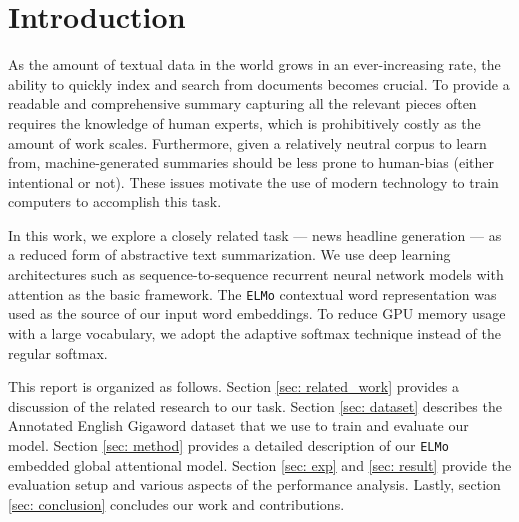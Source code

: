 \section{Introduction}

As the amount of textual data in the world grows in an ever-increasing rate, the ability to quickly index and search from documents becomes crucial. To provide a readable and comprehensive summary capturing all the relevant pieces often requires the knowledge of human experts, which is prohibitively costly as the amount of work scales. Furthermore, given a relatively neutral corpus to learn from, machine-generated summaries should be less prone to human-bias (either intentional or not). These issues motivate the use of modern technology to train computers to accomplish this task. 

In this work, we explore a closely related task --- news headline generation --- as a reduced form of abstractive text summarization. We use deep learning architectures such as sequence-to-sequence recurrent neural network models with attention as the basic framework. The \texttt{ELMo} contextual word representation \cite{peters2018deep} was used as the source of our input word embeddings. To reduce GPU memory usage with a large vocabulary, we adopt the adaptive softmax technique \cite{grave2016efficient} instead of the regular softmax. 

This report is organized as follows. Section \ref{sec: related_work} provides a discussion of the related research to our task. Section \ref{sec: dataset} describes the Annotated English Gigaword dataset \cite{graff2003english} that we use to train and evaluate our model. Section \ref{sec: method} provides a detailed description of our \texttt{ELMo} embedded global attentional model. Section \ref{sec: exp} and \ref{sec: result} provide the evaluation setup and various aspects of the performance analysis. Lastly, section \ref{sec: conclusion} concludes our work and contributions. 

